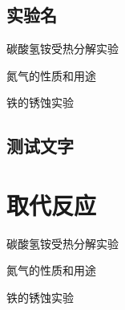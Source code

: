 \documentclass[color=orange]{textbook-cn}%
\begin{document}
\lipsum


\begin{Project}
\section{实验名}
\begin{Point}
\lipsum[2]
\end{Point}

\begin{Case}
\item 碳酸氢铵受热分解实验
\item 氮气的性质和用途
\item 铁的锈蚀实验
\end{Case}

\subsection{测试文字}
\lipsum
\begin{Definition}[定理名称]
\lipsum[2]
\end{Definition}

\begin{Application}
\lipsum[1-2]
\lipsum[3-4]
\end{Application}
\end{Project}


\section{取代反应}
\begin{Point}
\lipsum[2]
\end{Point}

\begin{Case}
\item 碳酸氢铵受热分解实验
\item 氮气的性质和用途
\item 铁的锈蚀实验
\end{Case}

\lipsum
\begin{Definition*}[定理名称定理名称定理名称定理名称定理名称定理名称]
\lipsum[2]
\end{Definition*}

\begin{Definition*}[定理名称]
\lipsum[2]
\end{Definition*}

\begin{Lemma}[引理名称]
\lipsum[2]
\end{Lemma}
\end{document}
